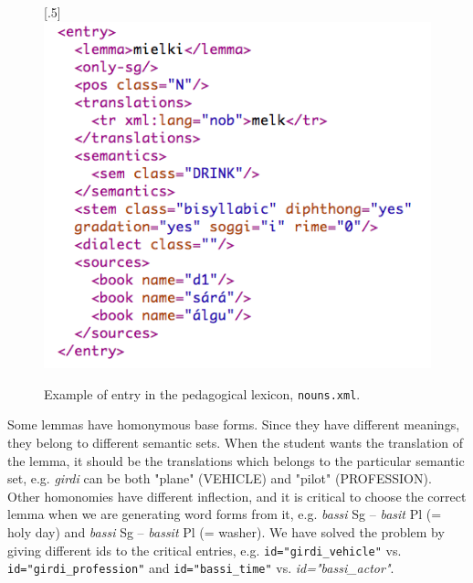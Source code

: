 \documentclass[11pt]{article}
\begin{document}
\begin{figure}[htbp]
\begin{center}
\scalebox{.5}[.5]{\includegraphics{presentation/img/nounlexicon.png}}\\
\caption{Example of entry in the pedagogical lexicon, \texttt{nouns.xml}.}
\label{nounlex}
\end{center}
\end{figure}

Some lemmas have homonymous base forms. Since they have different meanings, they belong to different semantic sets. When the student wants the translation of the lemma, it should be the translations which belongs to the particular semantic set, e.g. \textit{girdi} can be both "plane" (VEHICLE) and "pilot" (PROFESSION). Other homonomies have different inflection, and it is critical to choose the correct lemma when we are generating word forms from it, e.g. \textit{bassi} Sg -- \textit{basit} Pl (= holy day) and \textit{bassi} Sg -- \textit{bassit} Pl (= washer). We have solved the problem by giving different ids to the critical entries, e.g. \texttt{id="girdi\_vehicle"} vs. 
\texttt{id="girdi\_profession"} and \texttt{id="bassi\_time"} vs. \textit{id="bassi\_actor"}.

\end{document}
